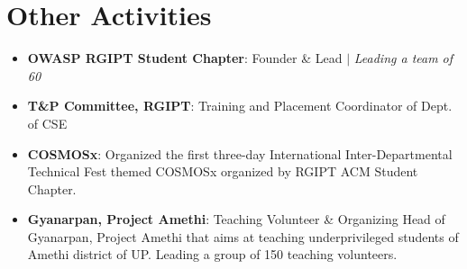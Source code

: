 \documentclass[a4paper]{article}
\newcommand{\resumeItem}[2]{
  \item\small{
    \textbf{#1}{: #2 \vspace{-2pt}}
  }
}
\newcommand{\resumeSubItem}[2]{\resumeItem{#1}{#2}\vspace{-4pt}}
\newcommand{\resumeSubHeadingListStart}{\begin{itemize}[leftmargin=*,
      label={}]}
\newcommand{\resumeSubHeadingListEnd}{\end{itemize}}
\begin{document}
\section{Other Activities}
\resumeSubHeadingListStart
\resumeSubItem{OWASP RGIPT Student Chapter}{Founder \&	Lead $|$ \emph{Leading
    a team of 60}}
\resumeSubItem{T\&P Committee, RGIPT}{Training and Placement Coordinator of
  Dept. of CSE}
\resumeSubItem{COSMOSx}{Organized the first three-day International
  Inter-Departmental Technical Fest themed COSMOSx organized by RGIPT ACM Student
  Chapter.}
\resumeSubItem{Gyanarpan, Project Amethi}{Teaching Volunteer \& Organizing Head
  of Gyanarpan, Project Amethi that aims at teaching underprivileged students of
  Amethi district of UP. Leading a group of 150 teaching volunteers.}
\resumeSubHeadingListEnd

\end{document}

